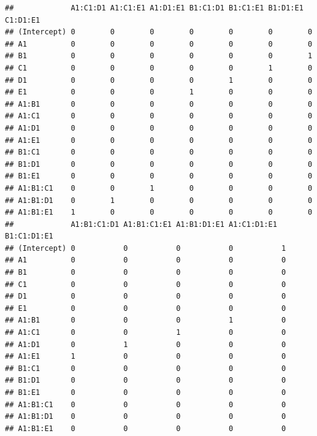 \documentclass[
]{book}
\theoremstyle{definition}
\theoremstyle{definition}
\theoremstyle{definition}
\theoremstyle{definition}
\theoremstyle{remark}
\begin{document}
\begin{verbatim}
##             A1:C1:D1 A1:C1:E1 A1:D1:E1 B1:C1:D1 B1:C1:E1 B1:D1:E1 C1:D1:E1
## (Intercept) 0        0        0        0        0        0        0       
## A1          0        0        0        0        0        0        0       
## B1          0        0        0        0        0        0        1       
## C1          0        0        0        0        0        1        0       
## D1          0        0        0        0        1        0        0       
## E1          0        0        0        1        0        0        0       
## A1:B1       0        0        0        0        0        0        0       
## A1:C1       0        0        0        0        0        0        0       
## A1:D1       0        0        0        0        0        0        0       
## A1:E1       0        0        0        0        0        0        0       
## B1:C1       0        0        0        0        0        0        0       
## B1:D1       0        0        0        0        0        0        0       
## B1:E1       0        0        0        0        0        0        0       
## A1:B1:C1    0        0        1        0        0        0        0       
## A1:B1:D1    0        1        0        0        0        0        0       
## A1:B1:E1    1        0        0        0        0        0        0       
##             A1:B1:C1:D1 A1:B1:C1:E1 A1:B1:D1:E1 A1:C1:D1:E1 B1:C1:D1:E1
## (Intercept) 0           0           0           0           1          
## A1          0           0           0           0           0          
## B1          0           0           0           0           0          
## C1          0           0           0           0           0          
## D1          0           0           0           0           0          
## E1          0           0           0           0           0          
## A1:B1       0           0           0           1           0          
## A1:C1       0           0           1           0           0          
## A1:D1       0           1           0           0           0          
## A1:E1       1           0           0           0           0          
## B1:C1       0           0           0           0           0          
## B1:D1       0           0           0           0           0          
## B1:E1       0           0           0           0           0          
## A1:B1:C1    0           0           0           0           0          
## A1:B1:D1    0           0           0           0           0          
## A1:B1:E1    0           0           0           0           0          

\end{verbatim}
\end{document}
